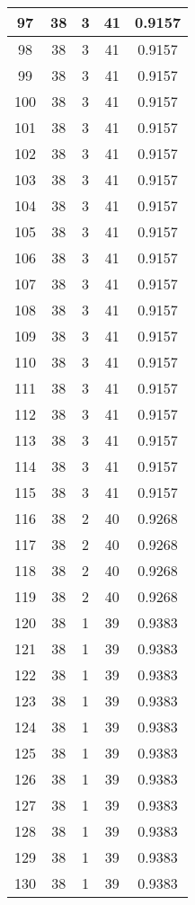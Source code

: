 \documentclass[letterpaper, 12pt]{article}
\begin{document}
\begin{longtable}{|c|c|c|c|c|}
\hline
97 & 38 & 3 & 41 & 0.9157 \\
\hline
98 & 38 & 3 & 41 & 0.9157 \\
\hline
99 & 38 & 3 & 41 & 0.9157 \\
\hline
100 & 38 & 3 & 41 & 0.9157 \\
\hline
101 & 38 & 3 & 41 & 0.9157 \\
\hline
102 & 38 & 3 & 41 & 0.9157 \\
\hline
103 & 38 & 3 & 41 & 0.9157 \\
\hline
104 & 38 & 3 & 41 & 0.9157 \\
\hline
105 & 38 & 3 & 41 & 0.9157 \\
\hline
106 & 38 & 3 & 41 & 0.9157 \\
\hline
107 & 38 & 3 & 41 & 0.9157 \\
\hline
108 & 38 & 3 & 41 & 0.9157 \\
\hline
109 & 38 & 3 & 41 & 0.9157 \\
\hline
110 & 38 & 3 & 41 & 0.9157 \\
\hline
111 & 38 & 3 & 41 & 0.9157 \\
\hline
112 & 38 & 3 & 41 & 0.9157 \\
\hline
113 & 38 & 3 & 41 & 0.9157 \\
\hline
114 & 38 & 3 & 41 & 0.9157 \\
\hline
115 & 38 & 3 & 41 & 0.9157 \\
\hline
116 & 38 & 2 & 40 & 0.9268 \\
\hline
117 & 38 & 2 & 40 & 0.9268 \\
\hline
118 & 38 & 2 & 40 & 0.9268 \\
\hline
119 & 38 & 2 & 40 & 0.9268 \\
\hline
120 & 38 & 1 & 39 & 0.9383 \\
\hline
121 & 38 & 1 & 39 & 0.9383 \\
\hline
122 & 38 & 1 & 39 & 0.9383 \\
\hline
123 & 38 & 1 & 39 & 0.9383 \\
\hline
124 & 38 & 1 & 39 & 0.9383 \\
\hline
125 & 38 & 1 & 39 & 0.9383 \\
\hline
126 & 38 & 1 & 39 & 0.9383 \\
\hline
127 & 38 & 1 & 39 & 0.9383 \\
\hline
128 & 38 & 1 & 39 & 0.9383 \\
\hline
129 & 38 & 1 & 39 & 0.9383 \\
\hline
130 & 38 & 1 & 39 & 0.9383 \\

\end{longtable}
\end{document}
